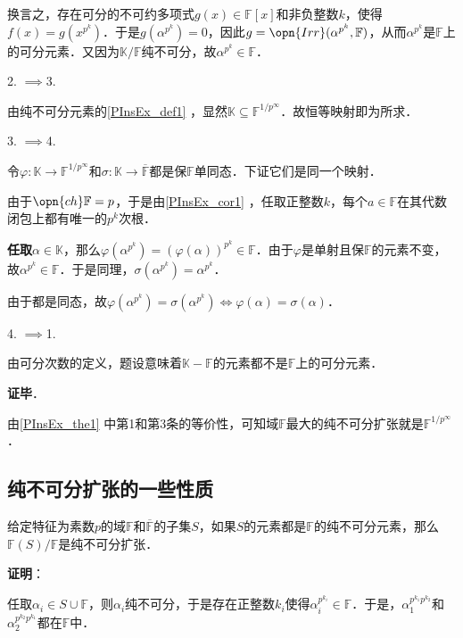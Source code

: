 换言之，存在可分的不可约多项式$g(x)\in\mathbb{F}[x]$和非负整数$k$，使得$f(x)=g(x^{p^k})$．于是$g(\alpha^{p^k})=0$，因此$g=\opn{Irr}(\alpha^{p^k}, \mathbb{F})$，从而$\alpha^{p^k}$是$\mathbb{F}$上的可分元素．又因为$\mathbb{K}/\mathbb{F}$纯不可分，故$\alpha^{p^k}\in\mathbb{F}$．


2. $\implies$3. 

由纯不可分元素的\autoref{PInsEx_def1} ，显然$\mathbb{K}\subseteq\mathbb{F}^{1/p^\infty}$．故恒等映射即为所求．

3. $\implies$4. 

令$\varphi:\mathbb{K}\to\mathbb{F}^{1/p^\infty}$和$\sigma:\mathbb{K}\to\overline{\mathbb{F}}$都是保$\mathbb{F}$单同态．下证它们是同一个映射．

由于$\opn{ch}\mathbb{F}=p$，于是由\autoref{PInsEx_cor1} ，任取正整数$k$，每个$a\in\mathbb{F}$在其代数闭包上都有唯一的$p^k$次根．

\textbf{任取}$\alpha\in\mathbb{K}$，那么$\varphi(\alpha^{p^k})=(\varphi(\alpha))^{p^k}\in\mathbb{F}$．由于$\varphi$是单射且保$\mathbb{F}$的元素不变，故$\alpha^{p^k}\in\mathbb{F}$．于是同理，$\sigma(\alpha^{p^k})=\alpha^{p^k}$．

由于都是同态，故$\varphi(\alpha^{p^k})=\sigma(\alpha^{p^k})\iff \varphi(\alpha)=\sigma(\alpha)$．

4. $\implies$1. 

由可分次数的定义，题设意味着$\mathbb{K}-\mathbb{F}$的元素都不是$\mathbb{F}$上的可分元素．


\textbf{证毕}．

由\autoref{PInsEx_the1} 中第1和第3条的等价性，可知域$\mathbb{F}$最大的纯不可分扩张就是$\mathbb{F}^{1/p^\infty}$．





\subsection{纯不可分扩张的一些性质}


\begin{theorem}{}
给定特征为素数$p$的域$\mathbb{F}$和$\overline{\mathbb{F}}$的子集$S$，如果$S$的元素都是$\mathbb{F}$的纯不可分元素，那么$\mathbb{F}(S)/\mathbb{F}$是纯不可分扩张．
\end{theorem}

\textbf{证明}：

任取$\alpha_i\in S\cup\mathbb{F}$，则$\alpha_i$纯不可分，于是存在正整数$k_i$使得$\alpha_i^{p^{k_i}}\in\mathbb{F}$．于是，$\alpha_1^{p^{k_1}p^{k_2}}$和$\alpha_2^{p^{k_2}p^{k_1}}$都在$\mathbb{F}$中．

